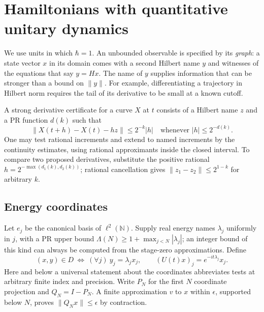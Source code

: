 \section{Hamiltonians with quantitative unitary dynamics}
\label{sec:dynamics}

We use units in which $\hbar=1$. An unbounded observable is specified by its
\emph{graph}: a state vector $x$ in its domain comes with a second Hilbert
name $y$ and witnesses of the equations that say $y=Hx$. The name of $y$
supplies information that can be stronger than a bound on $\|y\|$.
For example, differentiating a trajectory in Hilbert norm requires the
tail of its derivative to be small at a known cutoff.

A strong derivative certificate for a curve $X$ at $t$ consists of a
Hilbert name $z$ and a PR function $d(k)$ such that
\[
 \|X(t+h)-X(t)-hz\|\le 2^{-k}|h|
 \quad\text{whenever } |h|\le 2^{-d(k)} .
\]
One may test rational increments and extend to named increments by
the continuity estimates, using rational approximants inside the closed
interval. To compare two proposed derivatives, substitute the positive
rational $h=2^{-\max(d_1(k),d_2(k))}$; rational cancellation gives
$\|z_1-z_2\|\le2^{1-k}$ for arbitrary $k$.

\subsection{Energy coordinates}

Let $e_j$ be the canonical basis of $\ell^2(\mathbb N)$. Supply real
energy names $\lambda_j$ uniformly in $j$, with a PR upper bound
$\Lambda(N)\ge 1+\max_{j<N}|\lambda_j|$; an integer bound of this kind
can always be computed from the stage-zero approximations. Define
\[
 (x,y)\in D \ \Longleftrightarrow\ (\forall j)\ y_j=\lambda_jx_j,
 \qquad (U(t)x)_j=e^{-it\lambda_j}x_j .
\]
Here and below a universal statement about the coordinates abbreviates
tests at arbitrary finite index and precision. Write $P_N$ for the first
$N$ coordinate projection and $Q_N=I-P_N$. A finite approximation $v$
to $x$ within $\epsilon$, supported below $N$, proves
$\|Q_Nx\|\le\epsilon$ by contraction.


